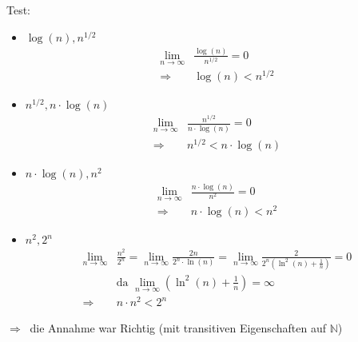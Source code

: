 \documentclass[12pt, a4paper, reqno]{amsart}
\begin{document}
    Test:
    \begin{itemize}
        \item $\log(n), n^{1/2}$
        \begin{align}
            \lim_{n\to \infty}&\frac{\log(n)}{n^{1/2}} = 0\\
            \Rightarrow\  &\log(n) < n^{1/2} 
        \end{align}
        
        \item $n^{1/2}, n\cdot \log(n)$
        \begin{align}
        \lim_{n\to \infty}&\frac{n^{1/2}}{n\cdot \log(n)} = 0\\
        \Rightarrow\  &n^{1/2}<n\cdot \log(n) 
        \end{align}
        
        \item $n\cdot \log(n), n^2$
        \begin{align}
        \lim_{n\to \infty}&\frac{n\cdot \log(n)}{n^{2}} = 0\\
        \Rightarrow\  &n\cdot \log(n) < n^2 
        \end{align}
        
        \item $n^2, 2^n$
        \begin{align}
        \lim_{n\to \infty}&\frac{n^{2}}{2^n} = \lim_{n\to \infty}\frac{2n}{2^n\cdot \ln(n)} = \lim_{n\to \infty}\frac{2}{2^n(\ln^2(n)+\frac 1 n)}= 0\\
        &\text{da } \lim_{n\to \infty} \left( \ln^2(n)+\frac 1 n \right)=\infty\\
        \Rightarrow\  &n\cdot n^2 < 2^n 
        \end{align}
    \end{itemize}
    $\Rightarrow\ $ die Annahme war Richtig (mit transitiven Eigenschaften auf $\mathbb N$)
\end{document}
